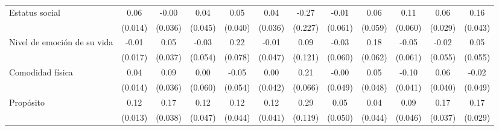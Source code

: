 \documentclass[12pt,spanish]{article}
\begin{document}
\begin{table}[H]
{{\begin{tabular}{l*{11}{c}}
        Estatus social   &     0.06\sym{***}&    -0.00         &     0.04         &     0.05         &     0.04         &    -0.27         &    -0.01         &     0.06         &     0.11         &     0.06\sym{*}  &     0.16\sym{***}\\
        
        &  (0.014)         &  (0.036)         &  (0.045)         &  (0.040)         &  (0.036)         &  (0.227)         &  (0.061)         &  (0.059)         &  (0.060)         &  (0.029)         &  (0.043)         \\
        [1em]
        
        Nivel de emoción de su vida&    -0.01         &     0.05         &    -0.03         &     0.22\sym{**} &    -0.01         &     0.09         &    -0.03         &     0.18\sym{**} &    -0.05         &    -0.02         &     0.05         \\
        
        &  (0.017)         &  (0.037)         &  (0.054)         &  (0.078)         &  (0.047)         &  (0.121)         &  (0.060)         &  (0.062)         &  (0.061)         &  (0.055)         &  (0.055)         \\
        [1em]
        
        Comodidad física&     0.04\sym{**} &     0.09\sym{*}  &     0.00         &    -0.05         &     0.00         &     0.21\sym{**} &    -0.00         &     0.05         &    -0.10\sym{*}  &     0.06         &    -0.02         \\
        
        &  (0.014)         &  (0.036)         &  (0.060)         &  (0.054)         &  (0.042)         &  (0.066)         &  (0.049)         &  (0.048)         &  (0.041)         &  (0.040)         &  (0.049)         \\
        [1em]
        
        Propósito&     0.12\sym{***}&     0.17\sym{***}&     0.12\sym{**} &     0.12\sym{**} &     0.12\sym{**} &     0.29\sym{*}  &     0.05         &     0.04         &     0.09\sym{*}  &     0.17\sym{***}&     0.17\sym{***}\\
        
        &  (0.013)         &  (0.038)         &  (0.047)         &  (0.044)         &  (0.041)         &  (0.119)         &  (0.050)         &  (0.044)         &  (0.046)         &  (0.037)         &  (0.029)         \\
        
        \hline


\end{tabular}}}
\end{table}
\end{document}
